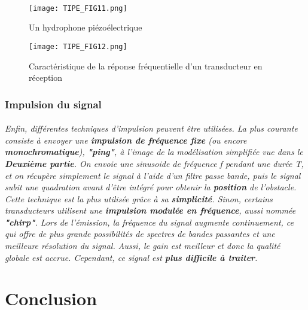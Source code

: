 \documentclass[a4paper,11pt]{article}
\begin{document}
\paragraph{\normalfont }
\begin{figure}[!h]
\texttt{[image: TIPE\_FIG11.png]}
\caption{Un hydrophone pi\'{e}zo\'{e}lectrique}
\label{fig_11}
\end{figure}
\begin{figure}[!h]
\texttt{[image: TIPE\_FIG12.png]}
\caption{Caract\'{e}ristique de la r\'{e}ponse fr\'{e}quentielle d'un transducteur en r\'{e}ception}
\label{fig_12}
\end{figure}
\section{Impulsion du signal}
\paragraph{\normalfont Enfin, diff\'{e}rentes techniques d'impulsion peuvent \^{e}tre utilis\'{e}es.\newline
La plus courante consiste \`{a} envoyer une \textbf{impulsion de fr\'{e}quence fixe} (ou encore \textbf{monochromatique}), \textbf{"ping"}, \`{a} l'image de la mod\'{e}lisation simplifi\'{e}e vue dans le \textbf{Deuxi\`{e}me partie}. On envoie une sinusoide de fr\'{e}quence f pendant une dur\'{e}e T, et on r\'{e}cup\`{e}re simplement le signal \`{a} l'aide d'un filtre passe bande, puis le signal subit une quadration avant d'\^{e}tre int\'{e}gr\'{e} pour obtenir la \textbf{position} de l'obstacle. Cette technique est la plus utilis\'{e}e gr\^{a}ce \`{a} sa \textbf{simplicit\'{e}}.\newline
Sinon, certains transducteurs utilisent une \textbf{impulsion modul\'{e}e en fr\'{e}quence}, aussi nomm\'{e}e \textbf{"chirp"}.  Lors de l'\'{e}mission, la fr\'{e}quence du signal augmente continuement, ce qui offre de plus grande possibilit\'{e}s de spectres de bandes passantes et une meilleure r\'{e}solution du signal. Aussi, le gain est meilleur et donc la qualit\'{e} globale est accrue. Cependant, ce signal est \textbf{plus difficile \`{a} traiter}.} \newpage
\part*{Conclusion}
\end{document}
